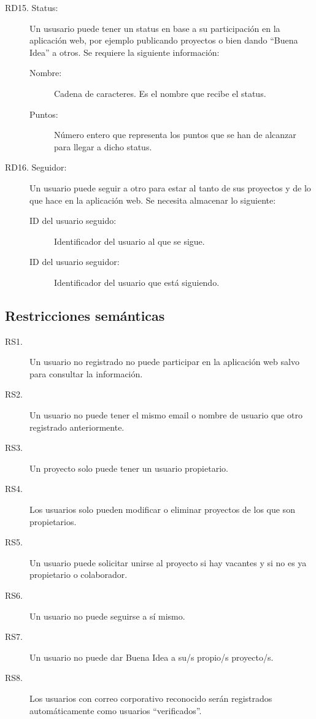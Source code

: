\begin{description}
    \item[RD15. Status:] Un ususario puede tener un status en base a su participación en la aplicación web, por ejemplo publicando proyectos o bien dando ``Buena Idea'' a otros. Se requiere la siguiente información:
        \begin{description}
            \item[Nombre:] Cadena de caracteres. Es el nombre que recibe el status.
            \item[Puntos:] Número entero que representa los puntos que se han de alcanzar para llegar a dicho status.
        \end{description}
    \item[RD16. Seguidor:] Un usuario puede seguir a otro para estar al tanto de sus proyectos y de lo que hace en la aplicación web. Se necesita almacenar lo siguiente:
        \begin{description}
            \item[ID del usuario seguido:] Identificador del usuario al que se sigue.
            \item[ID del usuario seguidor:] Identificador del usuario que está siguiendo.
        \end{description}
\end{description}

\subsection*{Restricciones semánticas}
\begin{description}
    \item[RS1.] Un usuario no registrado no puede participar en la aplicación web salvo para consultar la información.
    \item[RS2.] Un usuario no puede tener el mismo email o nombre de usuario que otro registrado anteriormente.
    \item[RS3.] Un proyecto solo puede tener un usuario propietario.
    \item[RS4.] Los usuarios solo pueden modificar o eliminar proyectos de los que son propietarios.
    \item[RS5.] Un usuario puede solicitar unirse al proyecto si hay vacantes y si no es ya propietario o colaborador.
    \item[RS6.] Un usuario no puede seguirse a sí mismo.
    \item[RS7.] Un usuario no puede dar Buena Idea a su/s propio/s proyecto/s.
    \item[RS8.] Los usuarios con correo corporativo reconocido serán registrados automáticamente como usuarios ``verificados''.
\end{description}

